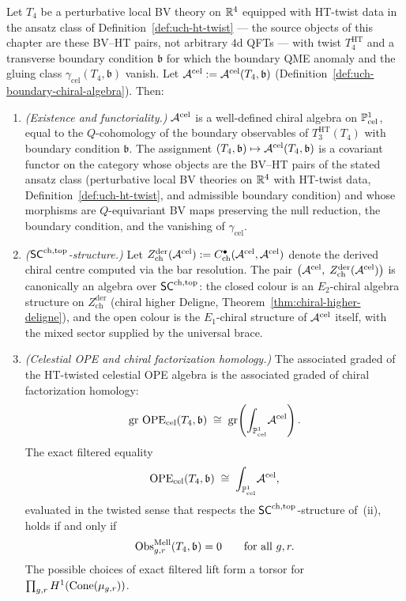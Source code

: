 \begin{theorem}
\label{thm:uch-main}
Let $T_4$ be a perturbative local BV theory on $\mathbb R^4$ equipped
with HT-twist data in the ansatz class of
Definition~\ref{def:uch-ht-twist} --- the source objects of this
chapter are these BV--HT pairs, not arbitrary $4$d QFTs --- with
twist $T_4^{\mathrm{HT}}$ and a transverse boundary condition
$\mathfrak b$
for which the boundary QME anomaly and the gluing class
$\gamma_{\mathrm{cel}}(T_4,\mathfrak b)$ vanish. Let
$\mathcal A^{\mathrm{cel}} := \mathcal A^{\mathrm{cel}}(T_4,\mathfrak b)$
(Definition~\ref{def:uch-boundary-chiral-algebra}). Then:
\begin{enumerate}[label=\textup{(\roman*)}]
\item \emph{(Existence and functoriality.)}
$\mathcal A^{\mathrm{cel}}$ is a well-defined chiral algebra on
$\mathbb P^1_{\text{cel}}$, equal to the $Q$-cohomology of the boundary
observables of $T_3^{\mathrm{HT}}(T_4)$ with boundary condition
$\mathfrak b$. The assignment
$(T_4,\mathfrak b)\mapsto\mathcal A^{\mathrm{cel}}(T_4,\mathfrak b)$ is a
covariant functor on the category whose objects are the BV--HT
pairs of the stated ansatz class (perturbative local BV theories on
$\mathbb R^4$ with HT-twist data, Definition~\ref{def:uch-ht-twist}, and
admissible boundary condition) and whose morphisms are $Q$-equivariant
BV maps preserving the null reduction, the boundary condition, and the
vanishing of $\gamma_{\mathrm{cel}}$.

\item \emph{($\mathsf{SC}^{\mathrm{ch,top}}$-structure.)}
Let $Z^{\mathrm{der}}_{\mathrm{ch}}(\mathcal A^{\mathrm{cel}}) :=
C^\bullet_{\mathrm{ch}}(\mathcal A^{\mathrm{cel}},\mathcal A^{\mathrm{cel}})$ denote
the derived chiral centre computed via the bar resolution. The pair
$\bigl(\mathcal A^{\mathrm{cel}},\; Z^{\mathrm{der}}_{\mathrm{ch}}(\mathcal A^{\mathrm{cel}})\bigr)$
is canonically an algebra over $\mathsf{SC}^{\mathrm{ch,top}}$: the closed colour is an
$E_2$-chiral algebra structure on $Z^{\mathrm{der}}_{\mathrm{ch}}$
(chiral higher Deligne, Theorem~\ref{thm:chiral-higher-deligne}), and the
open colour is the $E_1$-chiral structure of $\mathcal A^{\mathrm{cel}}$
itself, with the mixed sector supplied by the universal brace.

\item \emph{(Celestial OPE and chiral factorization homology.)}
The associated graded of the HT-twisted celestial OPE algebra is the
associated graded of chiral factorization homology:
\[
\operatorname{gr}\,\mathrm{OPE}_{\text{cel}}(T_4,\mathfrak b)
\;\cong\;
\operatorname{gr}\!\left(\int_{\mathbb P^1_{\text{cel}}}\!\mathcal A^{\mathrm{cel}}\right).
\]
The exact filtered equality
\[
\mathrm{OPE}_{\text{cel}}(T_4,\mathfrak b)
\;\cong\;
\int_{\mathbb P^1_{\text{cel}}}\!\mathcal A^{\mathrm{cel}},
\]
evaluated in the twisted sense that respects the $\mathsf{SC}^{\mathrm{ch,top}}$-structure
of~\textup{(ii)}, holds if and only if
\[
\operatorname{Obs}^{\mathrm{Mell}}_{g,r}(T_4,\mathfrak b)=0
\qquad
\text{for all } g,r.
\]
The possible choices of exact filtered lift form a torsor for
\(\prod_{g,r}H^1(\operatorname{Cone}(\mu_{g,r}))\).
\end{enumerate}
\end{theorem}

